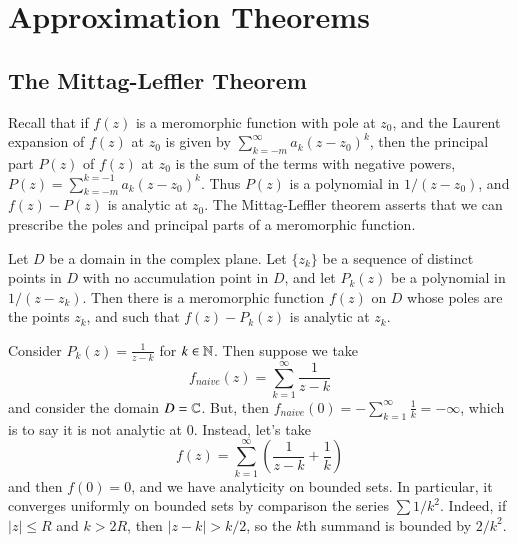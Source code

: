 %
%
%
\chapter{Approximation Theorems}
\label{Approx} %

\section{The Mittag-Leffler Theorem}

Recall that if $f(z)$ is a meromorphic function with pole at $z_0$, and the Laurent expansion of $f(z)$ at $z_0$ is given by $\sum_{k=-m}^{\infty}a_k(z-z_0)^k$, then the principal part $P(z)$ of $f(z)$ at $z_0$ is the sum of the terms with negative powers, $P(z) = \sum_{k=-m}^{k=-1}a_k(z-z_0)^k$. Thus $P(z)$ is a polynomial in $1/(z-z_0)$, and $f(z)-P(z)$ is analytic at $z_0$. The Mittag-Leffler theorem asserts that we can prescribe the poles and principal parts of a meromorphic function.

\begin{theorem}
    Let $D$ be a domain in the complex plane. Let $\{z_k\}$ be a sequence of distinct points in $D$ with no accumulation point in $D$, and let $P_k(z)$ be a polynomial in $1/(z-z_k)$. Then there is a meromorphic function $f(z)$ on $D$ whose poles are the points $z_k$, and such that $f(z) - P_k(z)$ is analytic at $z_k$.
\end{theorem}


\begin{example}
    Consider $P_k(z) = \frac{1}{z-k}$ for $k \in \mathbb N$. Then suppose we take \begin{equation*}
        f_{naive}(z) = \sum_{k=1}^{\infty}\frac{1}{z-k}
    \end{equation*}
    and consider the domain $D = \mathbb C$. But, then $f_{naive}(0) = -\sum_{k=1}^{\infty}\frac{1}{k} = -\infty$, which is to say it is not analytic at $0$. Instead, let's take \begin{equation*}
        f(z) = \sum_{k=1}^{\infty}\left(\frac{1}{z-k}+\frac{1}{k}\right)
    \end{equation*}
    and then $f(0) = 0$, and we have analyticity on bounded sets. In particular, it converges uniformly on bounded sets by comparison the series $\sum 1/k^2$. Indeed, if $|z| \leq R$ and $k > 2R$, then $|z-k| > k/2$, so the $k$th summand is bounded by $2/k^2$.
\end{example}

